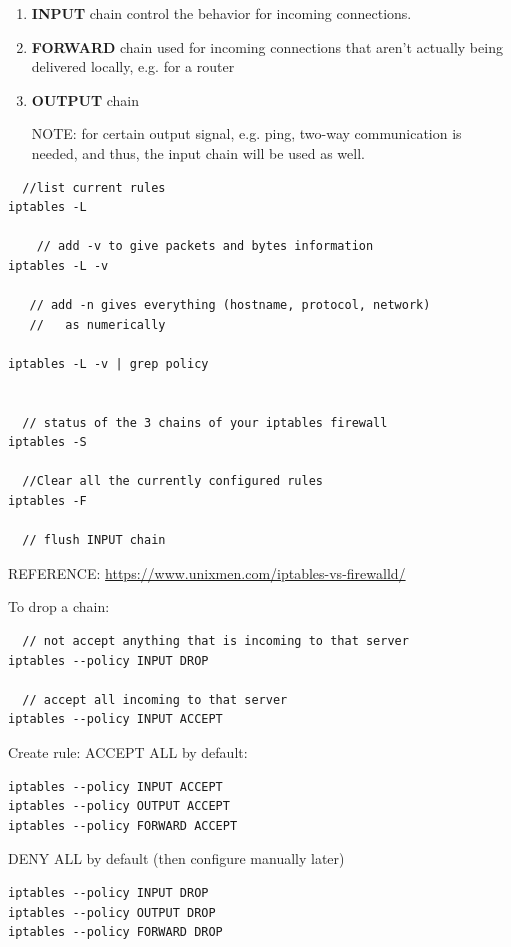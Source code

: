\begin{enumerate}
  \item {\bf INPUT} chain
   control the behavior for incoming connections.
      
  \item {\bf FORWARD} chain
   used for incoming connections that aren't actually being delivered locally,
   e.g. for a router
  
  \item {\bf OUTPUT} chain
  
  NOTE: for certain output signal, e.g. ping, two-way communication is needed,
  and thus, the input chain will be used as well.
  
\end{enumerate}

\begin{verbatim}
  //list current rules
iptables -L
   
    // add -v to give packets and bytes information
iptables -L -v

   // add -n gives everything (hostname, protocol, network)
   //   as numerically

iptables -L -v | grep policy


  // status of the 3 chains of your iptables firewall
iptables -S 

  //Clear all the currently configured rules
iptables -F

  // flush INPUT chain

\end{verbatim}

REFERENCE: \url{https://www.unixmen.com/iptables-vs-firewalld/}

To drop a chain:
\begin{verbatim}
  // not accept anything that is incoming to that server
iptables --policy INPUT DROP

  // accept all incoming to that server
iptables --policy INPUT ACCEPT
\end{verbatim}

Create rule: ACCEPT ALL by default:
\begin{verbatim}
iptables --policy INPUT ACCEPT
iptables --policy OUTPUT ACCEPT
iptables --policy FORWARD ACCEPT
\end{verbatim}


DENY ALL by default (then configure manually later)
\begin{verbatim}
iptables --policy INPUT DROP
iptables --policy OUTPUT DROP
iptables --policy FORWARD DROP
\end{verbatim}

